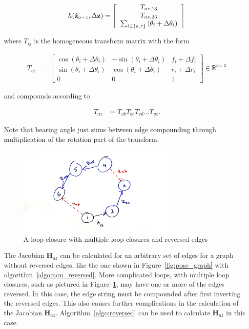 \begin{align*}
	h(\hat{\mathbf{z}}_{a-z},\Delta\mathbf{z}) =  \left[\begin{array}{c}
	T_{az,13} \\ T_{az,23} \\ \sum_{i \in \{a,z\}} \left( \theta_i + \Delta\theta_i \right)
	\end{array}\right]
\end{align*}

where $T_{ij}$ is the  homogeneous transform matrix with the form

\begin{align*}
  T_{ij} &= \left[\begin{array}{ccc}
  \cos(\theta_i + \Delta\theta_i) & -\sin(\theta_i + \Delta\theta_i) & f_i + \Delta f_i \\
  \sin(\theta_i + \Delta\theta_i) &  \cos(\theta_i + \Delta\theta_i) & r_i + \Delta r_i \\ 0 & 0 & 1
\end{array}\right] \in \mathbb{R}^{3 \times 3}
\end{align*}

and compounds according to

\begin{align*}
  T_{az} &= T_{ab} T_{bc} T_{cd} ... T_{yz}.
\end{align*}

Note that bearing angle just sums between edge compounding through multiplication of the rotation part of the transform.

\begin{figure}
  \includegraphics[width=0.7\textwidth]{figures/multiple_lc.jpg}
  \caption{A loop closure with multiple loop closures and reversed edges}
  \label{fig:reversed_pose_graph}
\end{figure}

The Jacobian $\mathbf{H}_{az}$ can be calculated for an arbitrary set of edges for a graph without reversed edges, like the one shown in Figure~\ref{fig:pose_graph} with algorithm~\ref{algo:non_reversed}.  More complicated loops, with multiple loop closures, such as pictured in Figure~\ref{fig:reversed_pose_graph}, may have one or more of the edges reversed.  In this case, the edge string must be compounded after first inverting the reversed edges.  This also causes further complications in the calculation of the Jacobian $\mathbf{H}_{az}$.  Algorithm~\ref{algo:reversed} can be used to calculate $\mathbf{H}_{az}$ in this case.


